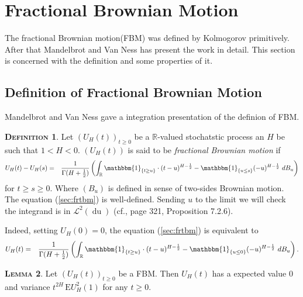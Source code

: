 \documentclass[a4paper, twoside, 11pt]{article}
\theoremstyle{definition}
\newtheorem{definition}{\scshape Definition}[section]
\newtheorem{lemma}[definition]{\scshape Lemma}
\newcommand{\brkt}[1]{\left({#1} \right)}
\begin{document}
\newpage
\section{Fractional Brownian Motion}
\setcounter{equation}{0}
The fractional Brownian motion(FBM) was defined by Kolmogorov primitively. After that Mandelbrot and Van Ness has present the work in detail. This section is concerned with the definition and some properties of it.

\subsection{Definition of Fractional Brownian Motion}
Mandelbrot and Van Ness \cite{mandelbrot} gave a integration presentation of the definion of FBM.
\begin{definition}
  Let $(U_H(t))_{t\ge 0}$ be a $\mathbb{R}$-valued stochatstic process an $H$ be such that $1<H<0$. $(U_H(t))$ is said to be \emph{fractional Brownian motion} if 
  \begin{eqnarray}
	U_H(t) - U_H(s) &=& \frac{1}{\Gamma(H+\frac{1}{2})}\brkt{\int_{\mathbb{R}} \mathbbm{1}_{\{t\ge u\}}\cdot (t-u)^{H-\frac{1}{2}} - \mathbbm{1}_{\{u\le s\}} (-u)^{H-\frac{1}{2}} \, \mathop{dB_u}}
	\label{sec:frtbm}
  \end{eqnarray}
  for $t\ge s \ge 0$. Where $(B_u)$ is defined in sense of two-sides Brownian motion. The equation (\ref{sec:frtbm}) is well-defined. Sending $u$ to the limit  we will check the integrand is in $\mathcal{L}^2(\mathop{du})$ (cf.\cite{samorodnitsky}, page 321, Proposition 7.2.6).
\end{definition}

Indeed, setting $U_H(0) = 0$, the equation (\ref{sec:frtbm}) is equivalent to
	 \begin{eqnarray}
	   U_H(t) &=& \frac{1}{\Gamma(H+\frac{1}{2})}\brkt{\int_{\mathbb{R}} \mathbbm{1}_{\{t\ge u\}}\cdot (t-u)^{H-\frac{1}{2}} - \mathbbm{1}_{\{u\le 0\}} (-u)^{H-\frac{1}{2}} \, \mathop{dB_u}}.
	\label{sec:fbm}
  \end{eqnarray}

	
\begin{lemma}
  Let $(U_H(t))_{t\ge 0}$ be a FBM. Then $U_H(t)$ has a expected value $0$ and variance $t^{2H}\, \mathrm{E} U^2_H(1)$ for any $t \ge 0$.
  \label{sec:fbmp1}
\end{lemma}
\end{document}
